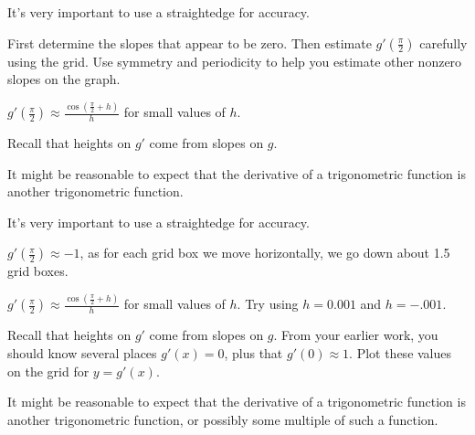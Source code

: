 \begin{smallhint}
\ba
	\item It's very important to use a straightedge for accuracy.
	\item First determine the slopes that appear to be zero.  Then estimate $g'(\frac{\pi}{2})$ carefully using the grid.  Use symmetry and periodicity to help you estimate other nonzero slopes on the graph.
	\item $g'(\frac{\pi}{2}) \approx \frac{\cos(\frac{\pi}{2}+h)}{h}$ for small values of $h$. 
	\item Recall that heights on $g'$ come from slopes on $g$.
	\item It might be reasonable to expect that the derivative of a trigonometric function is another trigonometric function.
\ea
\end{smallhint}
\begin{bighint}
\ba
	\item It's very important to use a straightedge for accuracy.
	\item $g'(\frac{\pi}{2}) \approx -1$, as for each grid box we move horizontally, we go down about 1.5 grid boxes.
	\item $g'(\frac{\pi}{2}) \approx \frac{\cos(\frac{\pi}{2}+h)}{h}$ for small values of $h$.  Try using $h = 0.001$ and $h = -.001$. 
	\item Recall that heights on $g'$ come from slopes on $g$.  From your earlier work, you should know several places $g'(x) = 0$, plus that $g'(0) \approx 1$.  Plot these values on the grid for $y = g'(x)$.
	\item It might be reasonable to expect that the derivative of a trigonometric function is another trigonometric function, or possibly some multiple of such a function.
\ea 
\end{bighint}
